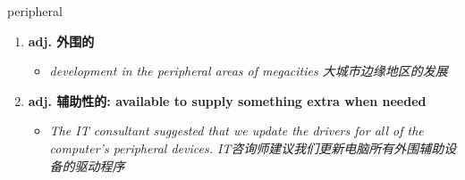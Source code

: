 
\begin{frame}
{\huge peripheral}
\begin{center}
\begin{enumerate}\Large
  \item \textbf{adj. 外围的}
  \begin{itemize}
    \item \em{\Large{development in the peripheral areas of megacities 大城市边缘地区的发展}}
  \end{itemize}
  \item \textbf{adj. 辅助性的: available to supply something extra when needed}
  \begin{itemize}
    \item \em{\Large{The IT consultant suggested that we update the drivers for all of the computer's peripheral devices. IT咨询师建议我们更新电脑所有外围辅助设备的驱动程序}}
  \end{itemize}
\end{enumerate}
\end{center}
\end{frame}

